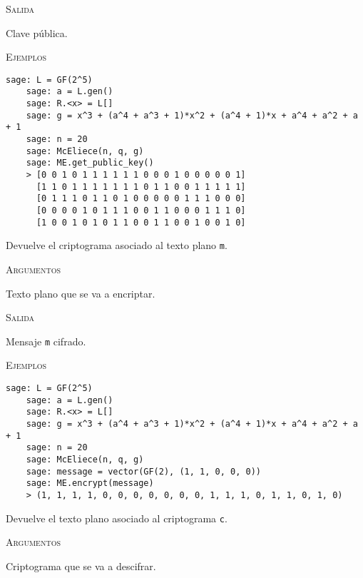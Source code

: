 \begin{description}[leftmargin=1em, font=\normalfont\ttfamily, style=nextline]
\begin{description}[font=\ttfamily, style=nextline]
  \textsc{Salida}
  \begin{description}[font=\normalfont\ttfamily]
    \item[] Clave pública.
  \end{description}

  \textsc{Ejemplos}
  \begin{lstlisting}[gobble=4]
    sage: L = GF(2^5)
    sage: a = L.gen()
    sage: R.<x> = L[]
    sage: g = x^3 + (a^4 + a^3 + 1)*x^2 + (a^4 + 1)*x + a^4 + a^2 + a + 1
    sage: n = 20
    sage: McEliece(n, q, g)
    sage: ME.get_public_key()
    > [0 0 1 0 1 1 1 1 1 1 0 0 0 1 0 0 0 0 0 1]
      [1 1 0 1 1 1 1 1 1 1 0 1 1 0 0 1 1 1 1 1]
      [0 1 1 1 0 1 1 0 1 0 0 0 0 0 1 1 1 0 0 0]
      [0 0 0 0 1 0 1 1 1 0 0 1 1 0 0 0 1 1 1 0]
      [1 0 0 1 0 1 0 1 1 0 0 1 1 0 0 1 0 0 1 0]
  \end{lstlisting}

  \item[encrypt(self, m)] Devuelve el criptograma asociado al texto plano \texttt{m}.

  \textsc{Argumentos}
  \begin{description}[font=\normalfont\ttfamily]
    \item[m] Texto plano que se va a encriptar.
  \end{description}

  \textsc{Salida}
  \begin{description}[font=\normalfont\ttfamily]
    \item[] Mensaje \texttt{m} cifrado.
  \end{description}

  \textsc{Ejemplos}
  \begin{lstlisting}[gobble=4]
    sage: L = GF(2^5)
    sage: a = L.gen()
    sage: R.<x> = L[]
    sage: g = x^3 + (a^4 + a^3 + 1)*x^2 + (a^4 + 1)*x + a^4 + a^2 + a + 1
    sage: n = 20
    sage: McEliece(n, q, g)
    sage: message = vector(GF(2), (1, 1, 0, 0, 0))
    sage: ME.encrypt(message)
    > (1, 1, 1, 1, 0, 0, 0, 0, 0, 0, 0, 1, 1, 1, 0, 1, 1, 0, 1, 0)
  \end{lstlisting}

  \item[decrypt(self, c)] Devuelve el texto plano asociado al criptograma \texttt{c}.

  \textsc{Argumentos}
  \begin{description}[font=\normalfont\ttfamily]
    \item[c] Criptograma que se va a descifrar.
  \end{description}


\end{description}
\end{description}
